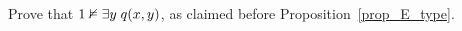 \documentclass[creche.tex]{subfiles}
\begin{document}
\begin{exercise}\label{ex_E_type}
Prove that $1\nvDash\exists y\;q(x,y)$, as claimed before Proposition~\ref{prop_E_type}.\QED
\end{exercise}

\begin{comment}
\begin{exercise}
Prove that the claim in Exercise~\ref{cadinalitafinitasaturazione} does not hold for an infinite tuple $x$. Hint. Let $x=\<x_i:i<\omega\>$. Given a formula $\phi(x_0)$ with exactly $2$ solutions define a type $p(x)$ with $2^\omega$ solution.\QED 
\end{exercise}

Il seguente esercizio \`e risolto. \`E un caso particolare del lemma~\ref{qfdefinability} di cui ricalca anche la dimostrazione che qui, grazie al modello mostro, \`e pi\`u facile da visualizzare.  Scriviamo \emph{$a\equiv_{\rm qf}b$\/} se le tuple $a$ e $b$ soddisfano le stesse formule libere.

\begin{exercise}\label{qfdefinabilitysemplice}
Sia $\phi(x)$ una formula pura. Si dimostri che le seguenti affermazioni sono equivalenti:
\begin{itemize}
\item[1] $\phi(x)$ \`e equivalente ad una formula senza quantificatori;
\item[2] $\phi(a)\iff\phi(b)$, per ogni coppia di tuple $a\equiv_{\rm qf} b$.
\end{itemize}
Soluzione. L'implicazione \ssf{1}$\IMP$\ssf{2} \`e ovvia. Dimostriamo \ssf{2}$\IMP$\ssf{1}. Da \ssf{2} abbiamo la seguente equivalenza:

\hfil$\displaystyle\phi(x)\ \ \iff\ \ \bigvee_{p(x)\imp\phi(x)} p(x)$

dove $p(x)$ corre su tutti i tipi puri senza quantificatori completi. Per compattezza possiamo riscrivere questa equivalenza come 

\hfil$\displaystyle\phi(x)\ \ \iff\ \ \bigvee_{\psi(x)\imp\phi(x)} \psi(x)$

dove $\psi(x)$ corre su tutte le formule pure e libere. Questa dice che $\neg\phi(x)$ \`e equivalente ad un tipo libero. Quindi, dall'esercizio~\ref{definibilitasaturazione}, otteniamo che $\phi(x)\iff\psi(x)$ per una qualche formula libera.\QED
\end{exercise}

\begin{exercise}
Sia $\U$ un modello saturo, $A\subseteq\U$ un sottoinsieme di cardinalit\`a piccola,  e sia $\psi(x)\in L(\U)$. Si dimostri che se $\psi(\U)$ \`e invariante per automorfismi che fissano $A$, allora $\psi(x)$ \`e equivalente ad una formula in $L(A)$.
\end{exercise}


\end{comment}
\end{document}
